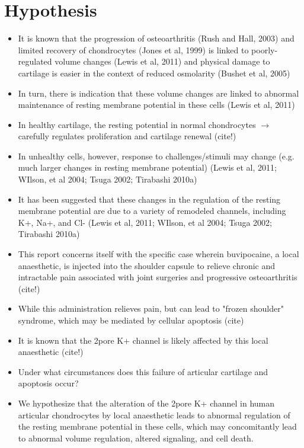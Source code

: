\section{Hypothesis}
\label{hypothesis}

\begin{itemize}
\item It is known that the progression of osteoarthritis (Rush and Hall, 2003) and limited recovery of chondrocytes (Jones et al, 1999) is linked to poorly-regulated volume changes (Lewis et al, 2011) and physical damage to cartilage is easier in the context of reduced osmolarity (Bushet et al, 2005)
\item In turn, there is indication that these volume changes are linked to abnormal maintenance of resting membrane potential in these cells (Lewis et al, 2011)
\item In healthy cartilage, the resting potential in normal chondrocytes $\rightarrow$ carefully regulates proliferation and cartilage renewal (cite!)
\item In unhealthy cells, however, response to challenges/stimuli may change (e.g. much larger changes in resting membrane potential) (Lewis et al, 2011; WIlson, et al 2004; Tsuga 2002; Tirabashi 2010a)
\item It has been suggested that these changes in the regulation of the resting membrane potential are due to a variety of remodeled channels, including K+, Na+, and Cl- (Lewis et al, 2011; WIlson, et al 2004; Tsuga 2002; Tirabashi 2010a)
\item This report concerns itself with the specific case wherein buvipocaine, a local anaesthetic, is injected into the shoulder capsule to relieve chronic and intractable pain associated with joint surgeries and progressive osteoarthritis (cite!)
\item While this administration relieves pain, but can lead to "frozen shoulder" syndrome, which may be mediated by cellular apoptosis (cite)
\item It is known that the 2pore K+ channel is likely affected by this local anaesthetic (cite!)
\item Under what circumstances does this failure of articular cartilage and apoptosis occur?
\item We hypothesize that the alteration of the 2pore K+ channel in human articular chondrocytes by local anaesthetic leads to abnormal regulation of the resting membrane potential in these cells, which may concomitantly lead to abnormal volume regulation, altered signaling, and cell death.

\end{itemize}

